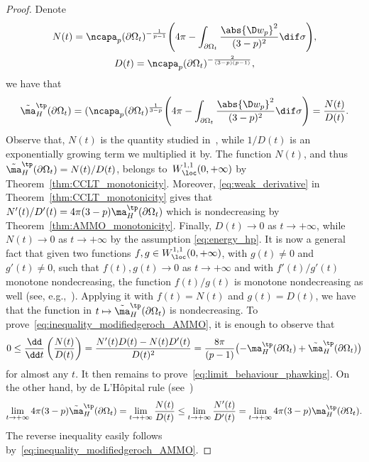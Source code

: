 \begin{proof}
Denote
\begin{gather*}
 N(t) =\ncapa_p(\partial \Omega_t)^{-\frac{1}{p-1}}\Bigg( 4 \pi - \int_{\partial \Omega_t} \frac{\abs{ \D w_p}^2}{(3-p)^2} \dif \sigma\Bigg), \\
 D(t)= \ncapa_p(\partial \Omega_t)^{-\frac{2}{(3-p)(p-1)}},
\end{gather*}
we have that
\[
 \tilde{\ma}^{\tp}_H(\partial \Omega_t)=(\ncapa_p(\partial \Omega_t)^{\frac{1}{3-p}}\Bigg( 4 \pi - \int_{\partial \Omega_t} \frac{\abs{ \D w_p}^2}{(3-p)^2} \dif \sigma\Bigg) =\frac{N(t)}{D(t)}.
\]
Observe that, $N(t)$ is the quantity studied in~\cite{chan_monotonicitygreenfunctions_2022,munteanu_comparisontheorems3dmanifolds_2023}, while $1/D(t)$ is an exponentially growing term we multiplied it by. The function $N(t)$, and thus $\tilde{\ma}^{\tp}_H(\partial \Omega_t)=N(t)/D(t)$, belongs to~$W^{1,1}_{\loc}(0,+\infty)$ by Theorem~\ref{thm:CCLT_monotonicity}. Moreover,
\eqref{eq:weak_derivative} in Theorem~\ref{thm:CCLT_monotonicity} gives that $N'(t)/D'(t) = 4\pi (3-p)\ma_{H}^{\tp}(\partial \Omega_t)$ which is nondecreasing by Theorem~\ref{thm:AMMO_monotonicity}. Finally, $D(t)\to 0$ as $t \to +\infty$, while $N(t) \to 0$ as $t \to +\infty$ by the assumption \eqref{eq:energy_hp}. It is now a general fact that given two functions $f,g\in W^{1,1}_{\loc}(0,+\infty)$, with $g(t)\neq 0$ and $g'(t)\neq 0$, such that $f(t),g(t)\to 0$ as $t \to +\infty$ and with $f'(t)/g'(t)$ monotone nondecreasing, the function $f(t)/g(t)$ is monotone nondecreasing as well (see, e.g.,~\cite[Lemma 3.2]{zhu_comparisongeometryriccicurvature_1997}). Applying it with $f(t)=N(t)$ and $g(t)=D(t)$, we have that the function in $t \mapsto \tilde{\ma}^{\tp}_H(\partial \Omega_t)$ is nondecreasing. To prove~\eqref{eq:inequality_modifiedgeroch_AMMO}, it is enough to observe that
\[
 0\leq \frac{ \dd }{\dd t} \left( \frac{N(t)}{D(t)}\right) = \frac{N'(t)D(t) - N(t)D'(t)}{D(t)^2} = \frac{8 \pi}{(p-1)}\bigl(-\ma^{\tp}_H(\partial \Omega_t) + \tilde{\ma}^{\tp}_{H}(\partial \Omega_t)\bigr)
\]
for almost any $t$.
It then remains to prove~\eqref{eq:limit_behaviour_phawking}. On the other hand, by de L'H\^opital rule (see~\cite[Theorem A.1]{benatti_isoperimetricriemannianpenroseinequality_2022})
\[
 \lim_{t \to +\infty} 4\pi (3-p) \tilde{\ma}^{\tp}_H(\partial \Omega_t)= \lim_{t \to +\infty} \frac{N(t)}{D(t)} \leq \lim_{t \to +\infty} \frac{N'(t)}{D'(t)} = \lim_{t \to +\infty} 4 \pi (3-p) \ma_H^{\tp}(\partial \Omega_t).
\]
The reverse inequality easily follows by~\eqref{eq:inequality_modifiedgeroch_AMMO}. \end{proof}

